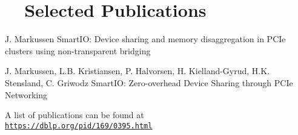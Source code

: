 \section[Selected Publications]{\faBook[regular]~~Selected Publications}

    {J. Markussen}
    {SmartIO: Device sharing and memory disaggregation in PCIe clusters using non-transparent bridging}

    {J. Markussen, L.B. Kristiansen, P. Halvorsen, H. Kielland-Gyrud, H.K. Stensland, C. Griwodz}
    {SmartIO: Zero-overhead Device Sharing through PCIe Networking}

%	
%
%

A list of publications can be found at\\
\texttt{\href{https://dblp.org/pid/169/0395.html}{https://dblp.org/pid/169/0395.html}}
